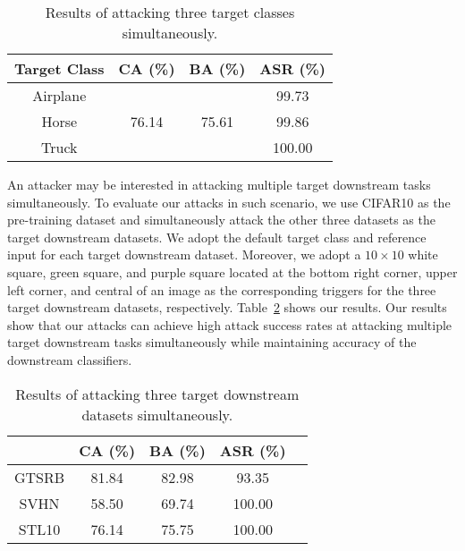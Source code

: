 \begin{table}[!t]\renewcommand{\arraystretch}{1.2} 
	\centering
	\caption{Results of attacking three target classes simultaneously. } 
	\begin{tabular}{|c|c|c|c|}
		\hline
	 Target Class & CA (\%) & BA (\%) & ASR (\%)   \\ \hline


		Airplane & \multirow{3}{*}{76.14} & \multirow{3}{*}{75.61} & 99.73  \\ \cline{1-1}\cline{4-4} 
		Horse &  &  & 99.86  \\ \cline{1-1} \cline{4-4} 
		Truck & & & 100.00  \\ \hline
	\end{tabular}
	\label{multiple_target_classes}
	\vspace{-1mm}
\end{table}





An attacker may be interested in attacking multiple target downstream tasks simultaneously. To evaluate our attacks in such scenario, we use CIFAR10 as the pre-training dataset and simultaneously attack the other three datasets as the target downstream datasets. We adopt the default target class and reference input for each target downstream dataset. 
Moreover, we adopt a $10 \times 10$ white square, green square, and purple square located at the bottom right corner, upper left corner, and central of an image as the corresponding triggers for the three target downstream datasets, respectively. Table~\ref{multiple_downstream_tasks} shows our results. Our results show that our attacks can achieve high attack success rates at attacking multiple target downstream tasks simultaneously while maintaining accuracy of the downstream classifiers. 





\begin{table}[tp]\renewcommand{\arraystretch}{1.2} 
	\centering
	\caption{Results of attacking three target downstream datasets simultaneously. } 
	\begin{tabular}{|c|c|c|c|c|}
		\hline
	\makecell{Target Downstream Dataset} & CA (\%) & BA (\%) & ASR (\%)   \\ \hline

	
		GTSRB & 81.84 & 82.98 & 93.35  \\ \cline{1-4} 
		SVHN & 58.50 & 69.74 & 100.00  \\ \cline{1-4} 
		STL10 & 76.14 & 75.75 & 100.00  \\ \hline
	\end{tabular}
	\label{multiple_downstream_tasks}
	\vspace{-5mm}
\end{table}







